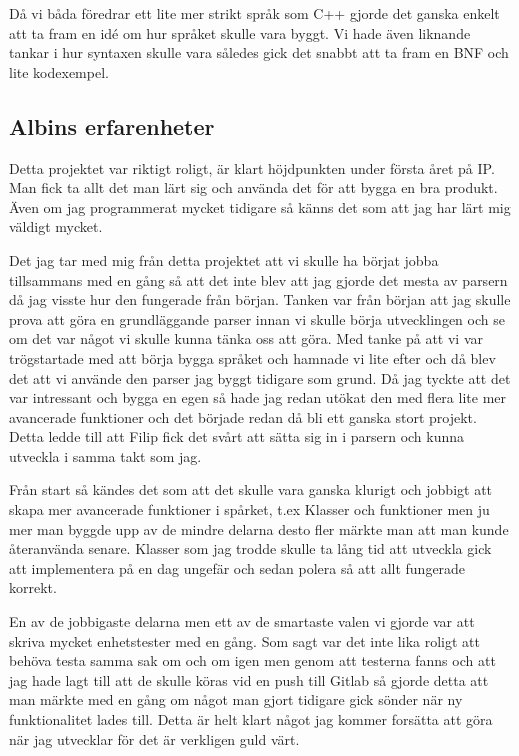 \documentclass{TDP003mall}
\begin{document}
Då vi båda föredrar ett lite mer strikt språk som C++ gjorde det ganska enkelt att ta fram en idé om hur språket skulle vara byggt.
Vi hade även liknande tankar i hur syntaxen skulle vara således gick det snabbt att ta fram en BNF och lite kodexempel.

\subsection{Albins erfarenheter}
Detta projektet var riktigt roligt, är klart höjdpunkten under första året på IP.
Man fick ta allt det man lärt sig och använda det för att bygga en bra produkt.
Även om jag programmerat mycket tidigare så känns det som att jag har lärt mig väldigt mycket.

Det jag tar med mig från detta projektet att vi skulle ha börjat jobba tillsammans med en gång så att det inte blev att jag gjorde det mesta av parsern då jag visste hur den fungerade från början. 
Tanken var från början att jag skulle prova att göra en grundläggande parser innan vi skulle börja utvecklingen och se om det var något vi skulle kunna tänka oss att göra. Med tanke på att vi var trögstartade med att börja bygga språket och hamnade vi lite efter och då blev det att vi använde den parser jag byggt tidigare som grund. Då jag tyckte att det var intressant och bygga en egen så hade jag redan utökat den med flera lite mer avancerade funktioner och det började redan då bli ett ganska stort projekt. Detta ledde till att Filip fick det svårt att sätta sig in i parsern och kunna utveckla i samma takt som jag.

Från start så kändes det som att det skulle vara ganska klurigt och jobbigt att skapa mer avancerade funktioner i spårket, t.ex Klasser och funktioner men ju mer man byggde upp av de mindre delarna desto fler märkte man att man kunde återanvända senare. Klasser som jag trodde skulle ta lång tid att utveckla gick att implementera på en dag ungefär och sedan polera så att allt fungerade korrekt.

En av de jobbigaste delarna men ett av de smartaste valen vi gjorde var att skriva mycket enhetstester med en gång. Som sagt var det inte lika roligt att behöva testa samma sak om och om igen men genom att testerna fanns och att jag hade lagt till att de skulle köras vid en push till Gitlab så gjorde detta att man märkte med en gång om något man gjort tidigare gick sönder när ny funktionalitet lades till. Detta är helt klart något jag kommer forsätta att göra när jag utvecklar för det är verkligen guld värt.
\end{document}
